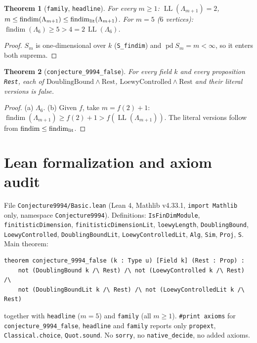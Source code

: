 \documentclass[11pt]{article}
\newtheorem{theorem}{Theorem}
\theoremstyle{definition}
\newcommand{\pd}{\operatorname{pd}}
\newcommand{\fd}{\operatorname{findim}}
\newcommand{\LL}{\operatorname{LL}}
\begin{document}
\begin{theorem}[\texttt{family}, \texttt{headline}]
For every $m\ge1$: $\LL(\Lambda_{m+1})=2$, $m\le\fd(\Lambda_{m+1})\le\fd_{\rm lit}(\Lambda_{m+1})$.
For $m=5$ ($6$ vertices): $\fd(\Lambda_6)\ge5>4=2\,\LL(\Lambda_6)$.
\end{theorem}
\begin{proof}
$S_m$ is one-dimensional over $k$ (\texttt{S\_findim}) and $\pd S_m=m<\infty$, so it enters both
suprema.
\end{proof}

\begin{theorem}[\texttt{conjecture\_9994\_false}]
For every field $k$ and every proposition \texttt{Rest}, each of
$\mathrm{DoublingBound}\wedge\mathrm{Rest}$, $\mathrm{LoewyControlled}\wedge\mathrm{Rest}$ and their
literal versions is false.
\end{theorem}
\begin{proof}
(a) $\Lambda_6$. (b) Given $f$, take $m=f(2)+1$: $\fd(\Lambda_{m+1})\ge f(2)+1>f(\LL(\Lambda_{m+1}))$.
The literal versions follow from $\fd\le\fd_{\rm lit}$.
\end{proof}

\section{Lean formalization and axiom audit}

File \texttt{Conjecture9994/Basic.lean} (Lean 4, Mathlib v4.33.1, \texttt{import Mathlib} only,
namespace \texttt{Conjecture9994}). Definitions: \texttt{IsFinDimModule}, \texttt{finitisticDimension},
\texttt{finitisticDimensionLit}, \texttt{loewyLength}, \texttt{DoublingBound},
\texttt{LoewyControlled}, \texttt{DoublingBoundLit}, \texttt{LoewyControlledLit}, \texttt{Alg},
\texttt{Sim}, \texttt{Proj}, \texttt{S}. Main theorem:
\begin{verbatim}
theorem conjecture_9994_false (k : Type u) [Field k] (Rest : Prop) :
    not (DoublingBound k /\ Rest) /\ not (LoewyControlled k /\ Rest) /\
    not (DoublingBoundLit k /\ Rest) /\ not (LoewyControlledLit k /\ Rest)
\end{verbatim}
together with \texttt{headline} ($m=5$) and \texttt{family} (all $m\ge1$).
\texttt{\#print axioms} for \texttt{conjecture\_9994\_false}, \texttt{headline} and \texttt{family}
reports only \texttt{propext}, \texttt{Classical.choice}, \texttt{Quot.sound}. No \texttt{sorry}, no
\texttt{native\_decide}, no added axioms.
\end{document}

